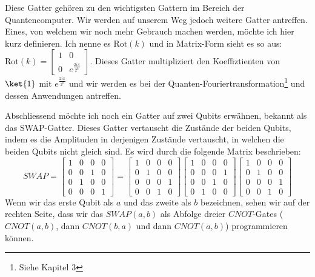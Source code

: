 Diese Gatter gehören zu den wichtigsten Gattern im Bereich der Quantencomputer. Wir werden auf unserem Weg jedoch weitere Gatter antreffen. Eines, von welchem wir noch mehr Gebrauch machen werden, möchte ich hier kurz definieren. Ich nenne es $\text{Rot}(k)$ und in Matrix-Form sieht es so aus: $\text{Rot}(k) = \begin{bmatrix}1 & 0 \\ 0 & e^{\frac{2i\pi}{2^k}}\end{bmatrix}$. Dieses Gatter multipliziert den Koeffiztienten von $\ket{1}$ mit $e^{\frac{2i\pi}{2^k}}$ und wir werden es bei der Quanten-Fouriertransformation\footnote{Siehe Kapitel 3} und dessen Anwendungen antreffen.

Abschliessend möchte ich noch ein Gatter auf zwei Qubits erwähnen, bekannt als das SWAP-Gatter. Dieses Gatter vertauscht die Zustände der beiden Qubits, indem es die Amplituden in derjenigen Zustände vertauscht, in welchen die beiden Qubits nicht gleich sind. Es wird durch die folgende Matrix beschrieben: $$ SWAP = \begin{bmatrix} 1 & 0 & 0 & 0 \\ 0 & 0 & 1 & 0 \\ 0 & 1 & 0 & 0 \\ 0 & 0 & 0 & 1 \end{bmatrix} = \begin{bmatrix}1 & 0 & 0 & 0 \\ 0 & 1 & 0 & 0 \\ 0 & 0 & 0 & 1 \\ 0 & 0 & 1 & 0\end{bmatrix} \begin{bmatrix}1 & 0 & 0 & 0 \\ 0 & 0 & 0 & 1 \\ 0 & 0 & 1 & 0 \\ 0 & 1 & 0 & 0 \end{bmatrix} \begin{bmatrix}1 & 0 & 0 & 0 \\ 0 & 1 & 0 & 0 \\ 0 & 0 & 0 & 1 \\ 0 & 0 & 1 & 0\end{bmatrix}$$
Wenn wir das erste Qubit als $a$ und das zweite als $b$ bezeichnen, sehen wir auf der rechten Seite, dass wir das $SWAP(a, b)$ als Abfolge dreier $CNOT$-Gates ($CNOT(a, b)$, dann $CNOT(b, a)$ und dann $CNOT(a, b)$) programmieren können.

